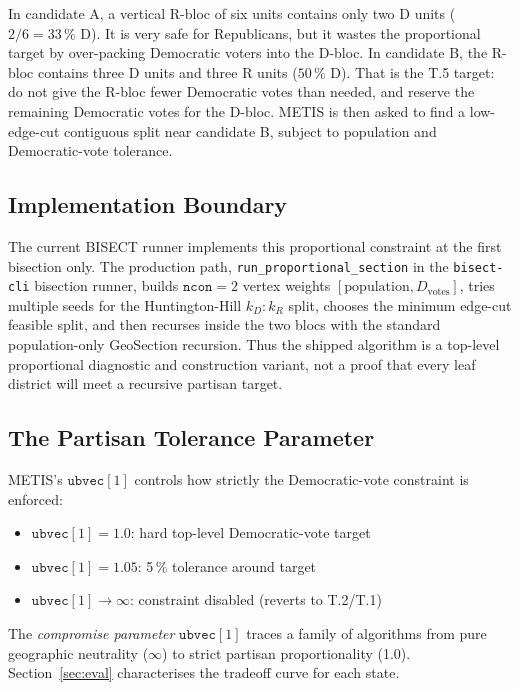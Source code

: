 In candidate A, a vertical R-bloc of six units contains only two D units
($2/6 = 33\,\%$ D). It is very safe for Republicans, but it wastes the
proportional target by over-packing Democratic voters into the D-bloc. In
candidate B, the R-bloc contains three D units and three R units ($50\,\%$ D).
That is the T.5 target: do not give the R-bloc fewer Democratic votes than
needed, and reserve the remaining Democratic votes for the D-bloc. METIS is
then asked to find a low-edge-cut contiguous split near candidate B, subject to
population and Democratic-vote tolerance.

\subsection{Implementation Boundary}
\label{sec:implementation-boundary}

The current BISECT runner implements this proportional constraint at the first
bisection only. The production path, \texttt{run\_proportional\_section} in the
\texttt{bisect-cli} bisection runner, builds $\mathtt{ncon}=2$ vertex weights
$[\text{population}, D_{\text{votes}}]$, tries multiple seeds for the
Huntington-Hill $k_D:k_R$ split, chooses the minimum edge-cut feasible split,
and then recurses inside the two blocs with the standard population-only
GeoSection recursion. Thus the shipped algorithm is a top-level proportional
diagnostic and construction variant, not a proof that every leaf district will
meet a recursive partisan target.

\subsection{The Partisan Tolerance Parameter}

METIS's $\mathtt{ubvec}[1]$ controls how strictly the Democratic-vote constraint
is enforced:
\begin{itemize}
  \item $\mathtt{ubvec}[1] = 1.0$: hard top-level Democratic-vote target
  \item $\mathtt{ubvec}[1] = 1.05$: 5\,\% tolerance around target
  \item $\mathtt{ubvec}[1] \to \infty$: constraint disabled (reverts to T.2/T.1)
\end{itemize}

The \emph{compromise parameter} $\mathtt{ubvec}[1]$ traces a family of algorithms
from pure geographic neutrality ($\infty$) to strict partisan proportionality (1.0).
Section~\ref{sec:eval} characterises the tradeoff curve for each state.

